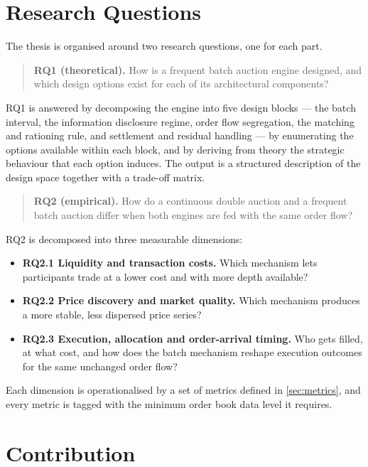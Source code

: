 \section{Research Questions}
\label{sec:rqs}

The thesis is organised around two research questions, one for each
part.

\begin{quote}
\textbf{RQ1 (theoretical).} How is a frequent batch auction engine
designed, and which design options exist for each of its architectural
components?
\end{quote}

RQ1 is answered by decomposing the engine into five design blocks ---
the batch interval, the information disclosure regime, order flow
segregation, the matching and rationing rule, and settlement and
residual handling --- by enumerating the options available within each
block, and by deriving from theory the strategic behaviour that each
option induces. The output is a structured description of the design
space together with a trade-off matrix.

\begin{quote}
\textbf{RQ2 (empirical).} How do a continuous double auction and a
frequent batch auction differ when both engines are fed with the same
order flow?
\end{quote}

RQ2 is decomposed into three measurable dimensions:

\begin{itemize}
  \item \textbf{RQ2.1 Liquidity and transaction costs.} Which mechanism
  lets participants trade at a lower cost and with more depth
  available?
  \item \textbf{RQ2.2 Price discovery and market quality.} Which
  mechanism produces a more stable, less dispersed price series?
  \item \textbf{RQ2.3 Execution, allocation and order-arrival timing.}
  Who gets filled, at what cost, and how does the batch mechanism
  reshape execution outcomes for the same unchanged order flow?
\end{itemize}

Each dimension is operationalised by a set of metrics defined in
\cref{sec:metrics}, and every metric is tagged with the minimum order
book data level it requires.

\section{Contribution}
\label{sec:contribution}

